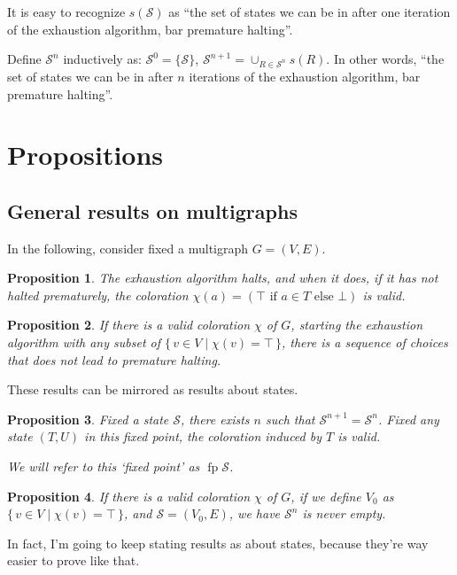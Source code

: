 \documentclass[11pt]{article}
\newcommand{\cS}{\mathcal{S}}
\DeclareMathOperator{\fp}{fp}
\newtheorem{prop}{Proposition}
\begin{document}
It is easy to recognize $s(\cS)$ as ``the set of states we can be in after one iteration of the exhaustion algorithm, bar premature halting''.

Define $\cS^n$ inductively as: $\cS^0 = \{\cS\}$, $\cS^{n+1} = \cup_{R \in \cS^n} s(R)$. In other words, ``the set of states we can be in after $n$ iterations of the exhaustion algorithm, bar premature halting''.

\section{Propositions}

\subsection{General results on multigraphs}

In the following, consider fixed a multigraph $G = (V,E)$.

\begin{prop}
The exhaustion algorithm halts, and when it does, if it has not halted prematurely, the coloration $\chi(a) = (\top \text{ if } a \in T \text{ else } \bot)$ is valid.
\end{prop}

\begin{prop}
If there is a valid coloration $\chi$ of $G$, starting the exhaustion algorithm with any subset of $\{ \, v \in V \mid \chi(v) = \top \, \}$, there is a sequence of choices that does not lead to premature halting.
\end{prop}

These results can be mirrored as results about states.

\begin{prop}
Fixed a state $\cS$, there exists $n$ such that $\cS^{n+1} = \cS^n$. Fixed any state $(T,U)$ in this fixed point, the coloration induced by $T$ is valid.

We will refer to this `fixed point' as $\fp \cS$.
\end{prop}

\begin{prop}
If there is a valid coloration $\chi$ of $G$, if we define $V_0$  as $\{ \, v \in V \mid \chi(v) = \top \, \}$, and $\cS = (V_0, E)$, we have $\cS^n$ is never empty.
\end{prop}

In fact, I'm going to keep stating results as about states, because they're way easier to prove like that.
\end{document}
